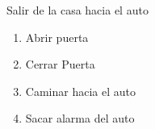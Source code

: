 \item Salir de la casa hacia el auto
  \begin{enumerate}
  \def\labelenumi{\arabic{enumi}.}
  \tightlist
  \item Abrir puerta
  \item Cerrar Puerta
  \item Caminar hacia el auto
  \item Sacar alarma del auto
  \end{enumerate}